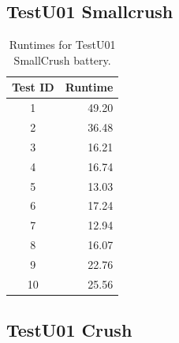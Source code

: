 \documentclass[
  digital,     %
  oneside,     %
  nosansbold,  %
  nocolorbold, %
  nolof,         %
  nolot,         %
]{fithesis4}
\begin{document}
\subsection{TestU01 Smallcrush}
\begin{table}[h]
  \begin{tabularx}{0.3\textwidth}{c|r}
    Test ID & Runtime \\
    \midrule
    1 & 49.20 \\
    2 & 36.48 \\
    3 & 16.21 \\
    4 & 16.74 \\
    5 & 13.03 \\
    6 & 17.24 \\
    7 & 12.94 \\
    8 & 16.07 \\
    9 & 22.76 \\
    10 & 25.56 \\
  \end{tabularx}
  \caption{Runtimes for TestU01 SmallCrush battery.}
  \label{tab:analysis_smallcrush_time}
\end{table}

\subsection{TestU01 Crush}
\end{document}
